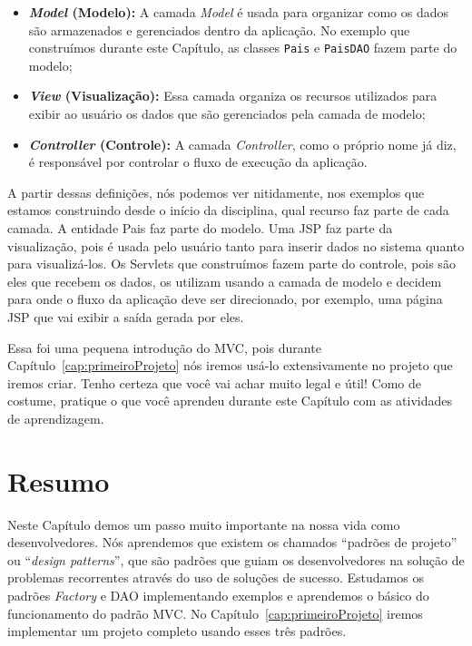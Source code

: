 \begin{itemize}

    \item \textbf{\textit{Model} (Modelo):} A camada \textit{Model} é usada para organizar como os dados são armazenados e gerenciados dentro da aplicação. No exemplo que construímos durante este Capítulo, as classes \texttt{Pais} e \texttt{PaisDAO} fazem parte do modelo;
    
    \item \textbf{\textit{View} (Visualização):} Essa camada organiza os recursos utilizados para exibir ao usuário os dados que são gerenciados pela camada de modelo;
    
    \item \textbf{\textit{Controller} (Controle):} A camada \textit{Controller}, como o próprio nome já diz, é responsável por controlar o fluxo de execução da aplicação.
    
\end{itemize}

A partir dessas definições, nós podemos ver nitidamente, nos exemplos que estamos construindo desde o início da disciplina, qual recurso faz parte de cada camada. A entidade Pais faz parte do modelo. Uma JSP faz parte da visualização, pois é usada pelo usuário tanto para inserir dados no sistema quanto para visualizá-los. Os Servlets que construímos fazem parte do controle, pois são eles que recebem os dados, os utilizam usando a camada de modelo e decidem para onde o fluxo da aplicação deve ser direcionado, por exemplo, uma página JSP que vai exibir a saída gerada por eles.

Essa foi uma pequena introdução do MVC, pois durante Capítulo~\ref{cap:primeiroProjeto} nós iremos usá-lo extensivamente no projeto que iremos criar. Tenho certeza que você vai achar muito legal e útil! Como de costume, pratique o que você aprendeu durante este Capítulo com as atividades de aprendizagem.


\section{Resumo}

Neste Capítulo demos um passo muito importante na nossa vida como desenvolvedores. Nós aprendemos que existem os chamados ``padrões de projeto'' ou ``\textit{design patterns}'', que são padrões que guiam os desenvolvedores na solução de problemas recorrentes através do uso de soluções de sucesso. Estudamos os padrões \textit{Factory} e DAO implementando exemplos e aprendemos o básico do funcionamento do padrão MVC. No Capítulo~\ref{cap:primeiroProjeto} iremos implementar um projeto completo usando esses três padrões. 


